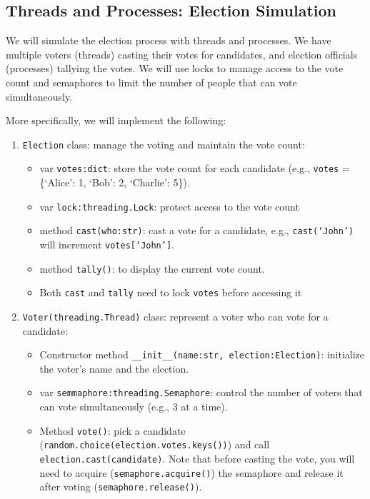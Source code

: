 \documentclass[oneside,11pt,dvipsnames]{book}
\newcommand{\code}[1]{\texttt{#1}}
\begin{document}
\subsection{Threads and Processes: Election Simulation}\label{exercise:election-simulation}

We will simulate the election process with threads and processes. We have multiple voters (threads) casting their votes for candidates, and election officials (processes) tallying the votes. We will use locks to manage access to the vote count and semaphores to limit the number of people that can vote simultaneously.

More specifically, we will implement the following: 
\begin{enumerate}
\item \code{Election} class: manage the voting and maintain the vote count:
\begin{itemize}
    \item var \code{votes:dict}: store the vote count for each candidate (e.g., \code{votes} = \{`Alice': 1, `Bob': 2, `Charlie': 5\}).
    \item var \code{lock:threading.Lock}: protect access to the vote count
    \item method \code{cast(who:str)}: cast a vote for a candidate, e.g., \code{cast(`John')} will increment \code{votes[`John']}.
    \item method \code{tally()}: to display the current vote count. 
    \item Both \code{cast} and \code{tally} need to lock \code{votes} before accessing it
\end{itemize}
\item \code{Voter(threading.Thread)} class: represent a voter who can vote for a candidate:
\begin{itemize}
    \item Constructor method \code{\_\_init\_\_(name:str, election:Election)}: initialize the voter's name and the election.
    \item var \code{semmaphore:threading.Semaphore}: control the number of voters that can vote simultaneously (e.g., 3 at a time).
    \item Method \code{vote()}: pick a candidate (\code{random.choice(election.votes.keys())}) and call \code{election.cast(candidate)}. Note that before casting the vote, you will need to acquire (\code{semaphore.acquire()}) the semaphore and release it after voting (\code{semaphore.release()}).
\end{itemize}

\end{enumerate}
\end{document}
